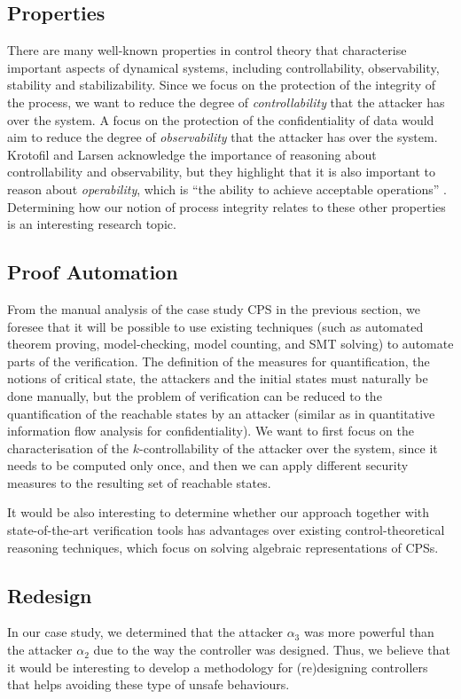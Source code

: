 {{\subsection{Properties}
There are many well-known properties in control theory that characterise important aspects of dynamical systems, including {controllability, observability, stability} and {stabilizability}. Since we focus on the protection of the integrity of the process, we want to reduce the degree of \emph{controllability} that the attacker has over the system. A focus on the protection of the confidentiality of data would aim to reduce the degree of \emph{observability} that the attacker has over the system. Krotofil and Larsen acknowledge the importance of reasoning about {controllability} and {observability}, but they highlight that it is also important to reason about \emph{operability}, which is ``the ability to achieve acceptable operations'' \cite{krotofil2015rocking}. Determining how our notion of process integrity relates to these other properties is an interesting research topic.

\subsection{Proof Automation}
{From the manual analysis of the case study CPS in the previous section, we foresee that it will be possible to use existing techniques (such as automated theorem proving, model-checking, model counting, and SMT solving) to automate parts of the verification. The definition of the measures for quantification, the notions of critical state, the attackers and the initial states must naturally be done manually, but the problem of verification can be reduced to the quantification of the reachable states by an attacker (similar as in quantitative information flow analysis for confidentiality). We want to first focus on the characterisation of the $k$-controllability of the attacker over the system, since it needs to be computed only once, and then we can apply different security measures to the resulting set of reachable states.}

It would be also interesting to determine whether our approach together with state-of-the-art verification tools has advantages over existing control-theoretical reasoning techniques, which focus on solving algebraic 
representations of CPSs.

\subsection{Redesign}
In our case study, we determined that the attacker $\alpha_3$ was more powerful than the attacker $\alpha_2$ due to the way the controller was designed. Thus, we believe that it would be interesting to develop a methodology for (re)designing controllers that helps avoiding these type of unsafe behaviours. 
}
}
